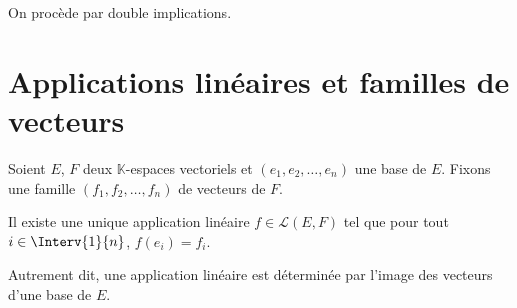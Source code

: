 \documentclass[a4paper,10pt]{report}
\begin{document}
\begin{preuve} On procède par double implications.
%
%
%
%

\vspace{6cm}
\end{preuve}

\section{Applications linéaires et familles de vecteurs}

\begin{prop} Soient $E$, $F$ deux $\mathbb{K}$-espaces vectoriels et $(e_1, e_2, \ldots, e_n)$ une base de $E$. Fixons une famille $(f_1, f_2, \ldots, f_n)$ de vecteurs de $F$. 

\noindent Il existe une unique application linéaire $f \in \mathcal{L}(E,F)$ tel que pour tout $i \in \Interv{1}{n}$, $f(e_i)=f_i$.

\noindent Autrement dit, une application linéaire est déterminée par l'image des vecteurs d'une base de $E$.
\end{prop}

%
\end{document}
